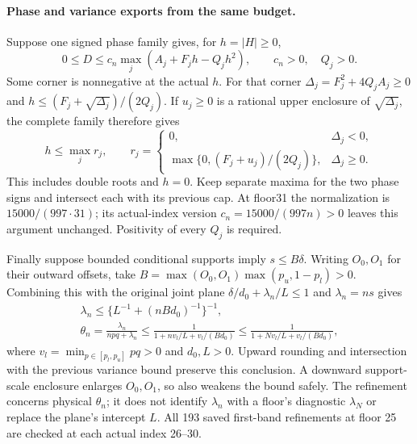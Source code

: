 \paragraph{Phase and variance exports from the same budget.}
Suppose one signed phase family gives, for $h=|H|\ge0$,
\[
 0\le D\le c_n\max_j(A_j+F_jh-Q_jh^2),\qquad c_n>0,
 \quad Q_j>0.
\]
Some corner is nonnegative at the actual $h$. For that corner
$\Delta_j=F_j^2+4Q_jA_j\ge0$ and
$h\le(F_j+\sqrt{\Delta_j})/(2Q_j)$.
If $u_j\ge0$ is a rational upper enclosure of $\sqrt{\Delta_j}$,
the complete family therefore gives
\[
 h\le\max_j r_j,\qquad
 r_j=\begin{cases}0,&\Delta_j<0,\\
 \max\{0,(F_j+u_j)/(2Q_j)\},&\Delta_j\ge0.
 \end{cases}
\]
This includes double roots and $h=0$. Keep separate maxima for
the two phase signs and intersect each with its previous cap.
At floor31 the normalization is $15000/(997\cdot31)$; its
actual-index version $c_n=15000/(997n)>0$ leaves this argument
unchanged. Positivity of every $Q_j$ is required.

Finally suppose bounded conditional supports imply $s\le B\delta$.
Writing $O_0,O_1$ for their outward offsets, take
$B=\max(O_0,O_1)\max(p_u,1-p_l)>0$.
Combining this with the original joint
plane $\delta/d_0+\lambda_n/L\le1$ and $\lambda_n=ns$ gives
\begin{gather*}
 \lambda_n\le\{L^{-1}+(nBd_0)^{-1}\}^{-1},\\
 \theta_n=\frac{\lambda_n}{npq+\lambda_n}
 \le\frac1{1+n v_l/L+v_l/(Bd_0)}
 \le\frac1{1+N v_l/L+v_l/(Bd_0)},
\end{gather*}
where $v_l=\min_{p\in[p_l,p_u]}pq>0$ and $d_0,L>0$.
Upward rounding and intersection with the previous variance bound
preserve this conclusion. A downward support-scale enclosure enlarges
$O_0,O_1$, so also weakens the bound safely. The refinement concerns
physical $\theta_n$; it does not identify $\lambda_n$ with a
floor's diagnostic $\lambda_N$ or replace the plane's intercept $L$.
All 193 saved first-band refinements at floor 25 are checked at each
actual index 26--30.


